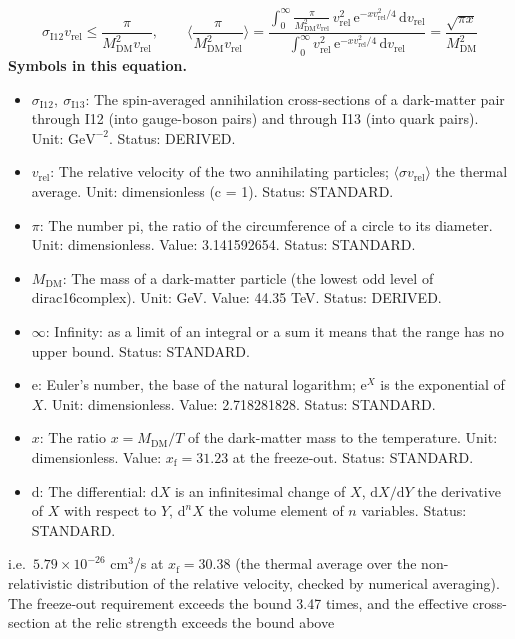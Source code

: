 \documentclass[
  10pt,
]{article}
\providecommand{\tightlist}{%
  \setlength{\itemsep}{0pt}\setlength{\parskip}{0pt}}
\begin{document}
\[ \sigma_{\mathrm{I12}}v_{\mathrm{rel}} \le \frac{\pi}{M_{\mathrm{DM}}^2v_{\mathrm{rel}}},\qquad \Big\langle\frac{\pi}{M_{\mathrm{DM}}^2v_{\mathrm{rel}}}\Big\rangle = \frac{\int_0^\infty\frac{\pi}{M_{\mathrm{DM}}^2v_{\mathrm{rel}}}\,v_{\mathrm{rel}}^2\,\mathrm{e}^{-xv_{\mathrm{rel}}^2/4}\,\mathrm{d}v_{\mathrm{rel}}}{\int_0^\infty v_{\mathrm{rel}}^2\,\mathrm{e}^{-xv_{\mathrm{rel}}^2/4}\,\mathrm{d}v_{\mathrm{rel}}} = \frac{\sqrt{\pi x}}{M_{\mathrm{DM}}^2} \]
\textbf{Symbols in this equation.}

\begin{itemize}
\tightlist
\item
  \(\sigma_{\mathrm{I12}},\ \sigma_{\mathrm{I13}}\): The spin-averaged
  annihilation cross-sections of a dark-matter pair through I12 (into
  gauge-boson pairs) and through I13 (into quark pairs). Unit:
  \(\mathrm{GeV}^{-2}\). Status: DERIVED.
\item
  \(v_{\mathrm{rel}}\): The relative velocity of the two annihilating
  particles; \(\langle\sigma v_{\mathrm{rel}}\rangle\) the thermal
  average. Unit: dimensionless (c = 1). Status: STANDARD.
\item
  \(\pi\): The number pi, the ratio of the circumference of a circle to
  its diameter. Unit: dimensionless. Value: 3.141592654. Status:
  STANDARD.
\item
  \(M_{\mathrm{DM}}\): The mass of a dark-matter particle (the lowest
  odd level of dirac16complex). Unit: GeV. Value: 44.35 TeV. Status:
  DERIVED.
\item
  \(\infty\): Infinity: as a limit of an integral or a sum it means that
  the range has no upper bound. Status: STANDARD.
\item
  \(\mathrm{e}\): Euler's number, the base of the natural logarithm;
  \(\mathrm{e}^{X}\) is the exponential of \(X\). Unit: dimensionless.
  Value: 2.718281828. Status: STANDARD.
\item
  \(x\): The ratio \(x = M_{\mathrm{DM}}/T\) of the dark-matter mass to
  the temperature. Unit: dimensionless. Value:
  \(x_{\mathrm{f}} = 31.23\) at the freeze-out. Status: STANDARD.
\item
  \(\mathrm{d}\): The differential: \(\mathrm{d}X\) is an infinitesimal
  change of \(X\), \(\mathrm{d}X/\mathrm{d}Y\) the derivative of \(X\)
  with respect to \(Y\), \(\mathrm{d}^nX\) the volume element of \(n\)
  variables. Status: STANDARD.
\end{itemize}

i.e.~\(5.79\times10^{-26}\) cm\(^3\)/s at \(x_{\mathrm{f}} = 30.38\)
(the thermal average over the non-relativistic distribution of the
relative velocity, checked by numerical averaging). The freeze-out
requirement exceeds the bound 3.47 times, and the effective
cross-section at the relic strength exceeds the bound above
\end{document}
